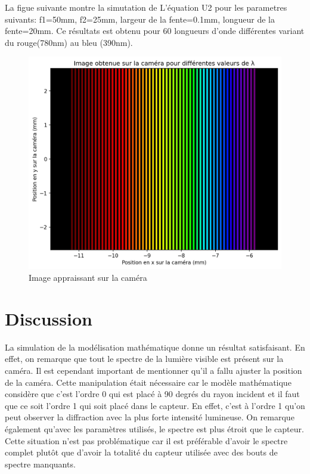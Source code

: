\documentclass[conference]{IEEEtran}
\begin{document}
 La figue suivante montre la simutation de L'équation U2 pour les parametres suivants: 
 f1=50mm, f2=25mm, largeur de la fente=0.1mm, longueur de la fente=20mm. Ce résultats est obtenu pour
 60 longueurs d'onde différentes variant du rouge(780nm) au bleu (390nm). 
 \begin{figure}[H]
    \centering
    \includegraphics[scale=0.5]{simulation.png}
    \caption{Image appraissant sur la caméra}
\end{figure}


\section{Discussion}
La simulation de la modélisation mathématique donne un résultat satisfaisant. En effet, on remarque que tout le spectre
de la lumière visible est présent sur la caméra. Il est cependant important de mentionner qu'il a fallu ajuster la
position de la caméra. Cette manipulation était nécessaire car le modèle mathématique considère que c'est l'ordre 0 qui est placé à 90 degrés du rayon
incident et il faut que ce soit l'ordre 1 qui soit placé dans le capteur. En effet, c'est à l'ordre 1 qu'on peut observer
la diffraction avec la plus forte intensité lumineuse. On remarque également qu'avec les paramètres utilisés, le spectre est plus étroit
que le capteur. Cette situation n'est pas problématique car il est préférable d'avoir le spectre complet plutôt que d'avoir la totalité du capteur utilisée
avec des bouts de spectre manquants.
\end{document}
